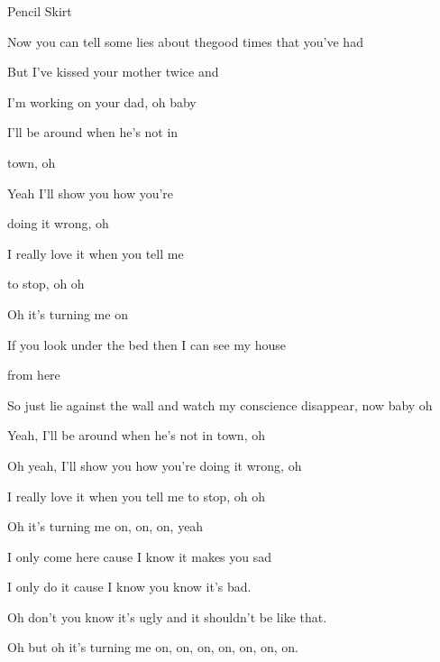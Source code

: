 \begin{song}{Pencil Skirt}
\begin{songverse}
\hspace{30pt} Now you can tell some lies about thegood times that you've had 


But I've kissed your mother twice and


I'm working on your dad, oh baby


\end{songverse}

\begin{songchorus}

 I'll be around when he's not in 
 
 town, oh 


 Yeah I'll show you how you're 
 
 doing it wrong, oh 


 I really love it when you tell me 
 
 to stop, oh oh 
                
 
 Oh it's turning me on

\end{songchorus}


\begin{songverse}
\hspace{30pt} If you look under the bed then I can see my house 

from here 

 So just lie against  the wall and watch my  conscience disappear, now baby oh


 Yeah, I'll be around when he's not in town, oh
 
 
 Oh yeah, I'll show you how you're doing it wrong, oh
 
 
 I really love it when you tell me to stop, oh oh
 
                  
 Oh it's turning me on, on, on, yeah

\end{songverse}


 \begin{songverse}[Bridge]

 \hspace{10pt}I only come here cause I know it makes you sad
 
 
 
 \hspace{10pt}I only do it cause I know you know it's bad.
 
 
 
 Oh don't you know it's ugly and it shouldn't be like that.
 
                          
 \hspace{10pt}Oh but oh it's turning me on, on, on, on, on, on, on.


  \hspace{15pt}   \hspace{15pt}     \hspace{15pt}   
 \end{songverse}

\end{song}